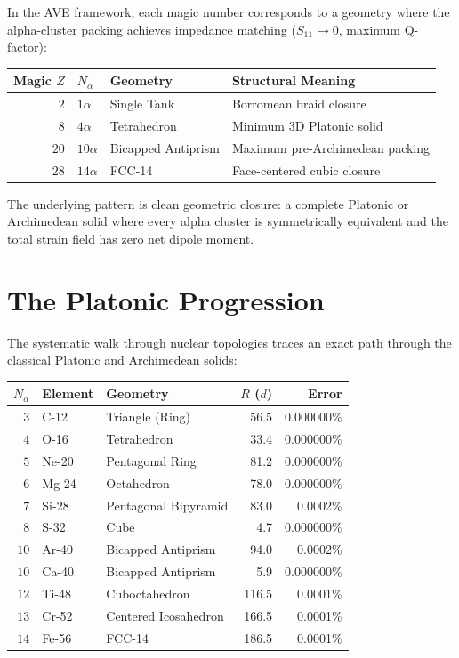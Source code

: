 In the AVE framework, each magic number corresponds to a geometry where the alpha-cluster packing achieves impedance matching ($S_{11} \to 0$, maximum Q-factor):
\begin{center}
\renewcommand{\arraystretch}{1.3}
\begin{tabular}{r l l l}
\toprule
\textbf{Magic $Z$} & \textbf{$N_\alpha$} & \textbf{Geometry} & \textbf{Structural Meaning} \\
\midrule
$2$  & $1\alpha$  & Single Tank       & Borromean braid closure \\
$8$  & $4\alpha$  & Tetrahedron       & Minimum 3D Platonic solid \\
$20$ & $10\alpha$ & Bicapped Antiprism & Maximum pre-Archimedean packing \\
$28$ & $14\alpha$ & FCC-14            & Face-centered cubic closure \\
\bottomrule
\end{tabular}
\end{center}

The underlying pattern is clean geometric closure: a complete Platonic or Archimedean solid where every alpha cluster is symmetrically equivalent and the total strain field has zero net dipole moment.

\section{The Platonic Progression}

The systematic walk through nuclear topologies traces an exact path through the classical Platonic and Archimedean solids:

\begin{center}
\renewcommand{\arraystretch}{1.3}
\begin{tabular}{r l l r r}
\toprule
\textbf{$N_\alpha$} & \textbf{Element} & \textbf{Geometry} & \textbf{$R$ ($d$)} & \textbf{Error} \\
\midrule
$3$  & C-12  & Triangle (Ring)        & 56.5  & 0.000000\% \\
$4$  & O-16  & Tetrahedron            & 33.4  & 0.000000\% \\
$5$  & Ne-20 & Pentagonal Ring        & 81.2  & 0.000000\% \\
$6$  & Mg-24 & Octahedron             & 78.0  & 0.000000\% \\
$7$  & Si-28 & Pentagonal Bipyramid   & 83.0  & 0.0002\%   \\
$8$  & S-32  & Cube                   & 4.7   & 0.000000\% \\
$10$ & Ar-40 & Bicapped Antiprism     & 94.0  & 0.0002\%   \\
$10$ & Ca-40 & Bicapped Antiprism     & 5.9   & 0.000000\% \\
$12$ & Ti-48 & Cuboctahedron          & 116.5 & 0.0001\%   \\
$13$ & Cr-52 & Centered Icosahedron   & 166.5 & 0.0001\%   \\
$14$ & Fe-56 & FCC-14                 & 186.5 & 0.0001\%   \\
\bottomrule
\end{tabular}
\end{center}

